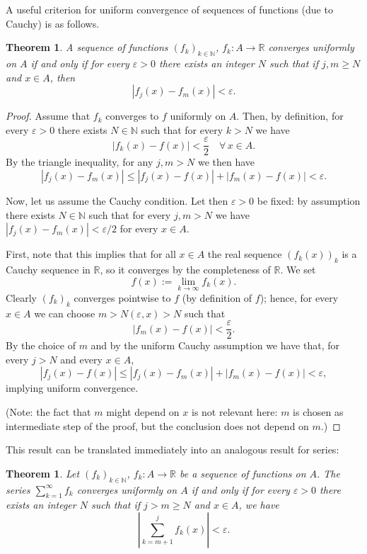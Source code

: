 \documentclass[a4paper,reqno]{amsart}
\numberwithin{equation}{section}
\newtheorem{theorem}[definition]{Theorem}
\def\N{\mathbb{N}}
\def\R{\mathbb{R}}
\begin{document}
\medskip

A useful criterion for uniform convergence of sequences of functions (due to Cauchy) is as follows.

\begin{theorem}\label{Cauchy:c}
A sequence of functions $(f_k)_{k\in \mathbb{N}}$, $f_k:A\to \R$ converges uniformly on $A$ if and only if for every $\varepsilon>0$ there exists an integer $N$ such that if $j,m\geq N$ and $x\in A$, then
$$
|f_j(x) - f_m(x)| < \varepsilon.
$$
\end{theorem}

\begin{proof}
Assume that $f_k$ converges to $f$ uniformly on $A$. Then, by definition, for every $\varepsilon>0$ there exists $N\in \N$ such that for every $k>N$ we have
$$
|f_k(x) - f(x)|<\frac{\varepsilon}{2} \quad \forall \, x\in A.
$$
By the triangle inequality, for any $j,m>N$ we then have
$$
|f_j(x) - f_m(x)|\leq |f_j(x) - f(x)| + |f_m(x) - f(x)| <\varepsilon.
$$

\medskip
Now, let us assume the Cauchy condition. Let then $\varepsilon>0$ be fixed: by assumption there exists $N\in \N$ such that for every $j,m>N$ we have $|f_j(x) - f_m(x)| <\varepsilon/2$ for every $x\in A$.

\noindent
First, note that this implies that for all $x\in A$ the real sequence $(f_k(x))_k$ is a Cauchy sequence in $\R$, so it converges by the completeness of $\R$. We set
$$
f(x):= \lim_{k\to \infty} f_k(x).
$$
Clearly $(f_k)_k$ converges pointwise to $f$ (by definition of $f$); hence, for every $x\in A$ we can choose $m>N(\varepsilon,x)>N$ such that
$$
|f_m(x) - f(x)|<\frac{\varepsilon}{2}.
$$
By the choice of $m$ and by the uniform Cauchy assumption we have that, for every $j>N$ and every $x\in A$,
$$
|f_j(x) - f(x)| \leq |f_j(x) - f_m(x)| + |f_m(x) - f(x)| <\varepsilon,
$$
implying uniform convergence.

(Note: the fact that $m$ might depend on $x$ is not relevant here: $m$ is chosen as intermediate step of the proof, but the conclusion does not depend on $m$.)

\end{proof}

This result can be translated immediately into an analogous result for series:

\begin{theorem}\label{Cauchy:s}
Let $(f_k)_{k\in \mathbb{N}}$, $f_k:A\to \R$ be a sequence of functions on $A$. The series $\sum_{k=1}^\infty f_k$ converges uniformly on $A$ if and only if for every $\varepsilon>0$ there exists an integer $N$ such that if $j>m\geq N$ and $x\in A$, we have
$$
\left|\sum_{k=m+1}^jf_k(x)\right| < \varepsilon.
$$
\end{theorem}
\end{document}
